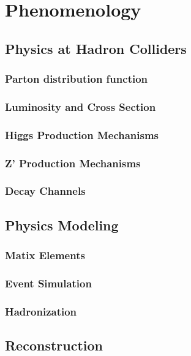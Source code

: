 \chapter{Phenomenology}

\section{Physics at Hadron Colliders}
\subsection{Parton distribution function}
\subsection{Luminosity and Cross Section}
\subsection{Higgs Production Mechanisms}
\subsection{Z' Production Mechanisms}
\subsection{Decay Channels}

\section{Physics Modeling}
\subsection{Matix Elements}
\subsection{Event Simulation}
\subsection{Hadronization}

\section{Reconstruction}
